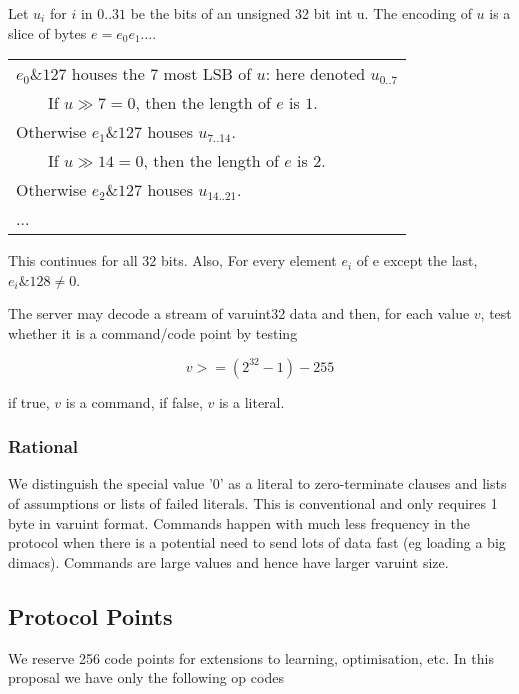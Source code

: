 \documentclass{article}
\begin{document}
Let $u_i$  for $i$ in $0..31$ be the bits of an unsigned 32 bit int u.  The encoding
of $u$ is a slice of bytes $e= e_0 e_1 \ldots $.

\begin{center}
\begin{tabular}{l}
 $e_0\&127$ houses the $7$ most LSB of $u$: here denoted $u_{0..7}$\\
~~~~If $u \gg 7 = 0$, then the length of $e$ is $1$.\\
Otherwise $e_1\&127$ houses $u_{7..14}$.\\
~~~~If $u \gg 14 = 0$, then the length of $e$ is $2$.\\
Otherwise $e_2\&127$ houses $u_{14..21}$.\\
...\\
\end{tabular}
\end{center}

This continues for all $32$ bits.  Also, For every element $e_i$ of e except the last, $e_i\&128 \neq 0$.

The server may decode a stream of varuint32 data and then, for
each value $v$, test whether it is a command/code point by testing

\[v >= (2^{32}-1) - 255\]

if true, $v$ is a command, if false, $v$ is a literal.

\subsubsection{Rational}
We distinguish the special value '0' as a literal to
zero-terminate clauses and lists of assumptions or lists of failed literals.
This is conventional and only requires 1 byte in varuint format.  Commands
happen with much less frequency in the protocol when there is a potential
need to send lots of data fast (eg loading a big dimacs).  Commands are
large values and hence have larger varuint size.

\subsection{Protocol Points}

We reserve 256 code points for extensions to learning, optimisation, etc.
In this proposal we have only the following op codes
\end{document}

